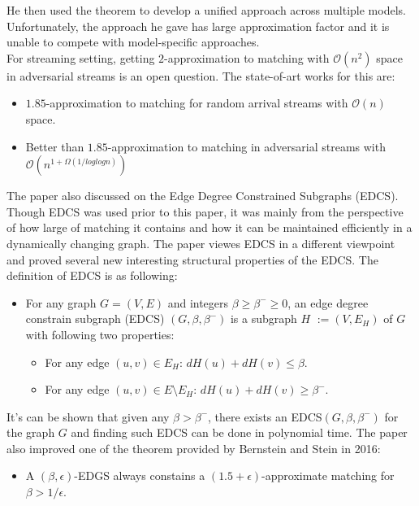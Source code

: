 \documentclass[12pt]{report}
\begin{document}
{He then used the theorem to develop a unified approach across multiple models. Unfortunately, the approach he gave has large approximation factor and it is unable to compete with model-specific approaches.\\

For streaming setting, getting $2$-approximation to matching with $\mathcal{O}(n^2)$ space in adversarial streams is an open question. The state-of-art works for this are: 

\begin{itemize}
    \item $1.85$-approximation to matching for random arrival streams with $\mathcal{O}(n)$ space.
    \item Better than $1.85$-approximation to matching in adversarial streams with $\mathcal{O}(n^{1+\Omega(1/log log n)})$
    \\
    
\end{itemize}

The paper also discussed on the Edge Degree Constrained Subgraphs (EDCS). Though EDCS was used prior to this paper, it was mainly from the perspective of how large of matching it contains and how it can be maintained efficiently in a dynamically changing graph. The paper viewes EDCS in a different viewpoint and proved several new interesting structural properties of the EDCS. The definition of EDCS is as following:
\begin{itemize}
    \item For any graph $G = (V,E)$ and integers $\beta \geq \beta^- \geq 0$, an edge degree constrain subgraph (EDCS) $(G,\beta,\beta^-)$ is a subgraph $H$ $:=(V,E_H)$ of $G$ with following two properties:
    \begin{itemize}
        \item For any edge $(u, v) \in E_H$: $dH (u) + dH (v) \leq \beta $.
        \item For any edge $(u, v) \in E \setminus E_H$: $dH (u) + dH (v) \geq \beta^-$.
    \end{itemize}
\end{itemize}

It's can be shown that given any $\beta > \beta^-$, there exists an EDCS$(G, \beta, \beta^-)$ for the graph $G$ and finding such EDCS can be done in polynomial time. The paper also improved one of the theorem provided by Bernstein and Stein in 2016: 

\begin{itemize}
    \item A $(\beta, \epsilon)$-EDGS always constains a $(1.5 + \epsilon)$-approximate matching for $\beta > 1/\epsilon$. 
\end{itemize}

}
\end{document}
